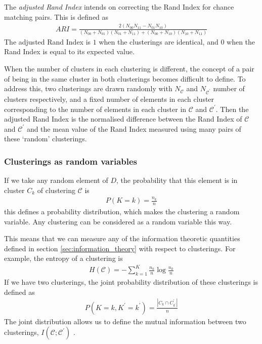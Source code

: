      The \textit{adjusted Rand Index} intends on correcting the Rand Index for chance matching pairs. This is defined as
      \begin{align}
          ARI = \frac{2\left( N_{00}N_{11} - N_{01}N_{10} \right)}{\left( N_{00} + N_{01} \right)\left( N_{01} + N_{11} \right) + \left( N_{00} + N_{10} \right)\left( N_{10} + N_{11} \right)}
      \end{align}
      The adjusted Rand Index is $1$ when the clusterings are identical, and $0$ when the Rand Index is equal to its expected value.

      When the number of clusters in each clustering is different, the concept of a pair of being in the same cluster in both clusterings becomes difficult to define. To address this, two clusterings are drawn randomly with $N_{\mathcal{C}}$ and $N_{\mathcal{C}^{\prime}}$ number of clusters respectively, and a fixed number of elements in each cluster corresponding to the number of elements in each cluster in $\mathcal{C}$ and $\mathcal{C}^{\prime}$. Then the adjusted Rand Index is the normalised difference between the Rand Index of $\mathcal{C}$ and $\mathcal{C}^{\prime}$ and the mean value of the Rand Index measured using many pairs of these `random' clusterings.

      \subsubsection{Clusterings as random variables}
      If we take any random element of $D$, the probability that this element is in cluster $C_k$ of clustering $\mathcal{C}$ is
      \begin{align}
          P(K=k) = \frac{n_k}{n}
      \end{align}
      this defines a probability distribution, which makes the clustering a random variable. Any clustering can be considered as a random variable this way.

      This means that we can measure any of the information theoretic quantities defined in section \ref{sec:information_theory} with respect to clusterings. For example, the entropy of a clustering is
      \begin{align}
          H(\mathcal{C}) = - \sum_{k=1}^K \frac{n_k}{n} \log \frac{n_k}{n}
      \end{align}
      If we have two clusterings, the joint probability distribution of these clusterings is defined as
      \begin{align}
          P(K=k,K^{\prime}=k^{\prime}) = \frac{|C_k \cap C^{\prime}_{k^\prime}|}{n}
      \end{align}
      The joint distribution allows us to define the mutual information between two clusterings, $I(\mathcal{C};\mathcal{C}^{\prime})$  \parencite{meila}.

